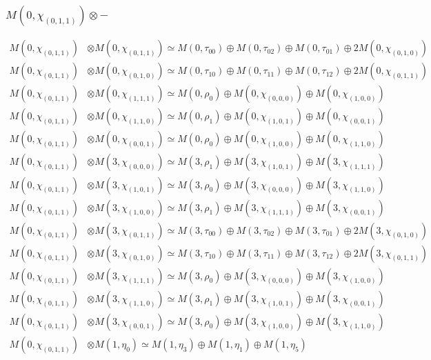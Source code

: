 \subsubsection{$ M(0,\chi_{(0,1,1)})\otimes -$}
\begin{align*}
M(0,\chi_{(0,1,1)}) &\otimes M(0,\chi_{(0,1,1)}) \simeq M(0,\tau_{00}) \oplus M(0,\tau_{02}) \oplus M(0,\tau_{01}) \oplus 2 M(0,\chi_{(0,1,0)})\\
M(0,\chi_{(0,1,1)}) &\otimes M(0,\chi_{(0,1,0)}) \simeq M(0,\tau_{10}) \oplus M(0,\tau_{11}) \oplus M(0,\tau_{12}) \oplus 2 M(0,\chi_{(0,1,1)})\\
M(0,\chi_{(0,1,1)}) &\otimes M(0,\chi_{(1,1,1)}) \simeq M(0,\rho_{0}) \oplus M(0,\chi_{(0,0,0)}) \oplus M(0,\chi_{(1,0,0)})\\
M(0,\chi_{(0,1,1)}) &\otimes M(0,\chi_{(1,1,0)}) \simeq M(0,\rho_{1}) \oplus M(0,\chi_{(1,0,1)}) \oplus M(0,\chi_{(0,0,1)})\\
M(0,\chi_{(0,1,1)}) &\otimes M(0,\chi_{(0,0,1)}) \simeq M(0,\rho_{0}) \oplus M(0,\chi_{(1,0,0)}) \oplus M(0,\chi_{(1,1,0)})\\
M(0,\chi_{(0,1,1)}) &\otimes M(3,\chi_{(0,0,0)}) \simeq M(3,\rho_{1}) \oplus M(3,\chi_{(1,0,1)}) \oplus M(3,\chi_{(1,1,1)})\\
M(0,\chi_{(0,1,1)}) &\otimes M(3,\chi_{(1,0,1)}) \simeq M(3,\rho_{0}) \oplus M(3,\chi_{(0,0,0)}) \oplus M(3,\chi_{(1,1,0)})\\
M(0,\chi_{(0,1,1)}) &\otimes M(3,\chi_{(1,0,0)}) \simeq M(3,\rho_{1}) \oplus M(3,\chi_{(1,1,1)}) \oplus M(3,\chi_{(0,0,1)})\\
M(0,\chi_{(0,1,1)}) &\otimes M(3,\chi_{(0,1,1)}) \simeq M(3,\tau_{00}) \oplus M(3,\tau_{02}) \oplus M(3,\tau_{01}) \oplus 2 M(3,\chi_{(0,1,0)})\\
M(0,\chi_{(0,1,1)}) &\otimes M(3,\chi_{(0,1,0)}) \simeq M(3,\tau_{10}) \oplus M(3,\tau_{11}) \oplus M(3,\tau_{12}) \oplus 2 M(3,\chi_{(0,1,1)})\\
M(0,\chi_{(0,1,1)}) &\otimes M(3,\chi_{(1,1,1)}) \simeq M(3,\rho_{0}) \oplus M(3,\chi_{(0,0,0)}) \oplus M(3,\chi_{(1,0,0)})\\
M(0,\chi_{(0,1,1)}) &\otimes M(3,\chi_{(1,1,0)}) \simeq M(3,\rho_{1}) \oplus M(3,\chi_{(1,0,1)}) \oplus M(3,\chi_{(0,0,1)})\\
M(0,\chi_{(0,1,1)}) &\otimes M(3,\chi_{(0,0,1)}) \simeq M(3,\rho_{0}) \oplus M(3,\chi_{(1,0,0)}) \oplus M(3,\chi_{(1,1,0)})\\
M(0,\chi_{(0,1,1)}) &\otimes M(1,\eta_{0}) \simeq M(1,\eta_{3}) \oplus M(1,\eta_{1}) \oplus M(1,\eta_{5})\\

\end{align*}
